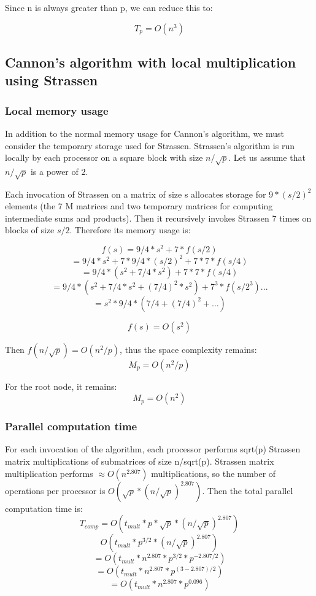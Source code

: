 \documentclass{article}
\begin{document}
Since n is always greater than p, we can reduce this to:

$$T_p = O(n^3)$$

\subsection{Cannon's algorithm with local multiplication using Strassen}

\subsubsection{Local memory usage}

In addition to the normal memory usage for Cannon's algorithm, we must consider
the temporary storage used for Strassen. Strassen's algorithm is run locally by
each processor on a square block with size $n/\sqrt{p}$. Let us assume that
$n/\sqrt{p}$ is a power of 2.

Each invocation of Strassen on a matrix of size s allocates storage for
$9*(s/2)^2$ elements (the 7 M matrices and two temporary matrices for computing
intermediate sums and products). Then it recursively invokes Strassen 7 times on
blocks of size $s/2$. Therefore its memory usage is:

$$f(s) = 9/4*s^2 + 7*f(s/2)$$
$$= 9/4*s^2 + 7*9/4*(s/2)^2 + 7*7*f(s/4)$$
$$= 9/4*(s^2 + 7/4*s^2) + 7*7*f(s/4)$$
$$ = 9/4*( s^2 + 7/4*s^2 + (7/4)^2*s^2 ) +7^3*f(s/2^3) ... $$
$$ = s^2 * 9/4 * (7/4 + (7/4)^2 + \dots)$$
	
$$f(s) = O(s^2)$$

Then $f(n/\sqrt{p}) = O(n^2/p)$, thus the space complexity remains:
$$M_p = O(n^2/p)$$

For the root node, it remains:
$$M_p = O(n^2)$$


\subsubsection{Parallel computation time}

For each invocation of the algorithm, each processor performs sqrt(p) Strassen
matrix multiplications of submatrices of size n/sqrt(p). Strassen matrix
multiplication performs $\approx O(n^{2.807})$ multiplications, so the number of
operations per processor is $O(\sqrt{p}*(n/\sqrt{p})^{2.807})$. Then the total
parallel computation time is:
$$T_{{comp}} = O(t_{{mult}}*p*\sqrt{p}*(n/\sqrt{p})^{2.807})$$
$$O(t_{{mult}}*p^{3/2}*(n/\sqrt{p})^{2.807})$$
$$= O(t_{{mult}}*n^{2.807} * p^{3/2} * p^{-2.807/2}) $$
$$= O(t_{{mult}} * n^{2.807} * p^{(3-2.807)/2}) $$
$$= O(t_{{mult}} * n^{2.807} * p^{0.096})$$
\end{document}
